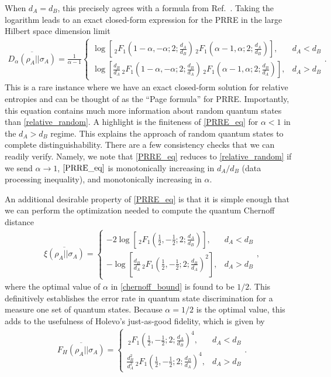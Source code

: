 \documentclass[a4paper,11pt]{article}
\begin{document}
When $d_A = d_B$, this precisely agrees with a formula from Ref.~\cite{2016PhRvA..93f2112P}.
Taking the logarithm leads to an exact closed-form expression for the PRRE in the large Hilbert space dimension limit
\begin{align}
    \overline{D_{\alpha}(\rho_A||\sigma_A)} = \frac{1}{{\alpha}-1}
    \begin{cases}\log\left[\, _2F_1\left(1-{\alpha},-{\alpha};2;\frac{d_A}{d_B}\right) \,
   _2F_1\left({\alpha}-1,{\alpha};2;\frac{d_A}{d_B}\right)\right], & d_A < d_B
   \\
   \log\left[
   \frac{d_B}{d_A} \, _2F_1\left(1-{\alpha},-{\alpha};2;\frac{d_B}{d_A}\right) \,
   _2F_1\left({\alpha}-1,{\alpha};2;\frac{d_B}{d_A}\right) \right], & d_A > d_B
   \end{cases}.
   \label{PRRE_eq}
\end{align}
This is a rare instance where we have an exact closed-form solution for relative entropies and can be thought of as the ``Page formula'' for PRRE. Importantly, this equation contains much more information about random quantum states than \eqref{relative_random}. A highlight is the finiteness of \eqref{PRRE_eq} for $\alpha < 1$ in the $d_A > d_B$ regime. This explains the approach of random quantum states to complete distinguishability. There are a few consistency checks that we can readily verify. Namely, we note that \eqref{PRRE_eq} reduces to \eqref{relative_random} if we send $\alpha \rightarrow 1$, $\eqref{PRRE_eq}$ is monotonically increasing in $d_A/d_B$ (data processing inequality), and monotonically increasing in $\alpha$.


An additional desirable property of \eqref{PRRE_eq} is that it is simple enough that we can perform the optimization needed to compute the quantum Chernoff distance
\begin{align}
    \overline{\xi(\rho_A || \sigma_A)} = \begin{cases}- 2\log \left[\,
   _2F_1\left(\frac{1}{2},-\frac{1}{2};2;\frac{d_A}{d_B}\right) \right], &  {d_A}<{d_B}
   \\
   -\log \left[\frac{d_B}{d_A}\,
   _2F_1\left(\frac{1}{2},-\frac{1}{2};2;\frac{d_B}{d_A}\right)^2 \right], & {d_A}>{d_B}
   \end{cases},
\end{align}
where the optimal value of $\alpha$ in \eqref{chernoff_bound} is found to be $1/2$.
This definitively establishes the error rate in quantum state discrimination for a measure one set of quantum states. Because $\alpha = 1/2$ is the optimal value, this adds to the usefulness of Holevo's just-as-good fidelity, which is given by
\begin{align}
    \overline{F_H(\rho_A || \sigma_A)} = \begin{cases}\, _2F_1\left(\frac{1}{2},-\frac{1}{2};2;\frac{d_A}{d_B}\right)^4,&d_A < d_B
    \\
    \frac{d_B^2}{d_A^2} \,_2F_1\left(\frac{1}{2},-\frac{1}{2};2;\frac{d_B}{d_A}\right)^4,&d_A > d_B
    \end{cases}.
    \label{holevo_fidelity}
\end{align}
\end{document}
